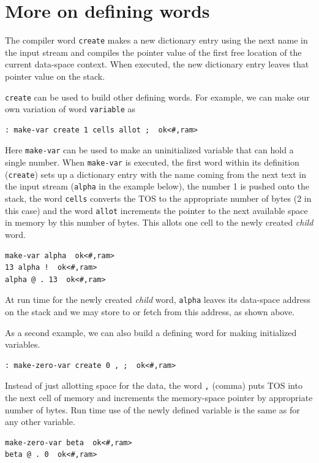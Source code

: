 \documentclass[12pt,a4paper]{article}
\begin{document}
\bigskip
\section{More on defining words}
\label{sec:more-defining-words}
%
The compiler word \verb!create! makes a new dictionary entry 
using the next name in the input stream and compiles the pointer value 
of the first free location of the current data-space context.
When executed, the new dictionary entry leaves that pointer value on the stack.

\medskip
\verb!create! can be used to build other defining words.
For example, we can make our own variation of word \verb!variable! as
\begin{verbatim}
: make-var create 1 cells allot ;  ok<#,ram>
\end{verbatim}
Here \verb!make-var! can be used to make an uninitialized variable that can hold a single number.
When \verb!make-var! is executed, the first word within its definition (\verb!create!)
sets up a dictionary entry with the name coming from the next text in the input stream
(\verb!alpha! in the example below),
the number 1 is pushed onto the stack, the word \verb!cells! converts the TOS to the 
appropriate number of bytes (2 in this case) and the word \verb!allot! increments
the pointer to the next available space in memory by this number of bytes.
This allots one cell to the newly created \textit{child} word.
\begin{verbatim}
make-var alpha  ok<#,ram>
13 alpha !  ok<#,ram>
alpha @ . 13  ok<#,ram>
\end{verbatim}
At run time for the newly created \textit{child} word, \verb!alpha! leaves its data-space address on the stack
and we may store to or fetch from this address, as shown above.

\medskip
As a second example, we can also build a defining word for making initialized variables.
\begin{verbatim}
: make-zero-var create 0 , ;  ok<#,ram>
\end{verbatim}
Instead of just allotting space for the data,
the word \verb!,! (comma) puts TOS into the next cell of memory and increments
the memory-space pointer by appropriate number of bytes.
Run time use of the newly defined variable is the same as for any other variable.
\begin{verbatim}
make-zero-var beta  ok<#,ram>
beta @ . 0  ok<#,ram>
\end{verbatim}

\bigskip
\end{document}
